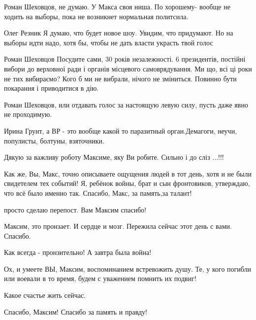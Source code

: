 \begin{itemize}
\begin{itemize}

Роман Шеховцов, не думаю. У Макса своя ниша.  По хорошему- вообще не ходить на
выборы, пока не возникнет нормальная политсила.


Олег Резник Я думаю, что будет новое шоу. Увидим, что придумают. Но на выборы
идти надо, хотя бы, чтобы не дать власти украсть твой голос


Роман Шеховцов Посудите сами, 30 років незалежності. 6 президентів, постійні
вибори до верховної ради і органів місцевого самоврядування. Ми що, всі ці роки
не тих вибираємо? Кого б ми не вибрали, нічого не зміниться. Повинно бути
покарання і приводитися в дію.


Роман Шеховцов, или отдавать голос за настоящую левую силу, пусть даже явно не проходимую.


Ирина Грунт, а ВР - это вообще какой то паразитный орган.Демагоги, неучи, популисты, болтуны, взяточники.

\end{itemize}

Дякую за важливу роботу Максиме, яку Ви робите.
Сильно і до сліз ...!!!


Как же, Вы, Макс, точно описываете ощущения людей в тот день, хотя и не были
свидетелем тех событий! Я, ребёнок войны, брат и сын фронтовиков, утверждаю,
что всё было именно так. Спасибо, Макс, за память,за талант!

просто сделаю перепост. Вам Максим спасибо!

Максим, это пронзает. И сердце и мозг. Пережила сейчас этот день с вами. Спасибо.

Как всегда - пронзительно! А завтра была война!


Ох, и умеете ВЫ, Максим, воспоминанием встревожить душу. Те, у кого погибли или
воевали в то время, будем с уважением помнить их подвиг!

Какое счастье жить сейчас.

Спасибо, Максим! Спасибо за память и правду!


\end{itemize}
